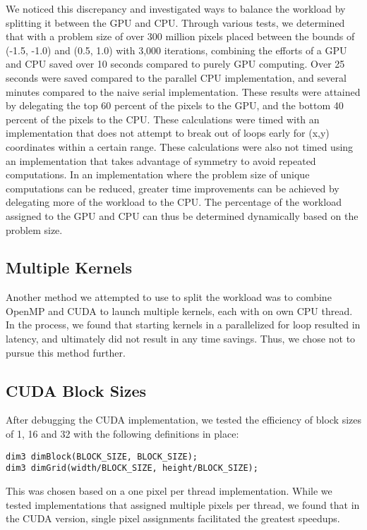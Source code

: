 \documentclass{article}
\begin{document}
We noticed this discrepancy and investigated ways to balance the workload by splitting it between the GPU and CPU.
Through various tests, we determined that with a problem size of over 300 million pixels placed between the bounds of (-1.5, -1.0) and (0.5, 1.0) with 3,000 iterations, combining the efforts of a GPU and CPU saved over 10 seconds compared to purely GPU computing.
Over 25 seconds were saved compared to the parallel CPU implementation, and several minutes compared to the naive serial implementation.
These results were attained by delegating the top 60 percent of the pixels to the GPU, and the bottom 40 percent of the pixels to the CPU.
These calculations were timed with an implementation that does not attempt to break out of loops early for (x,y) coordinates within a certain range.
These calculations were also not timed using an implementation that takes advantage of symmetry to avoid repeated computations.
In an implementation where the problem size of unique computations can be reduced, greater time improvements can be achieved by delegating more of the workload to the CPU.
The percentage of the workload assigned to the GPU and CPU can thus be determined dynamically based on the problem size.

\subsection{Multiple Kernels}

Another method we attempted to use to split the workload was to combine OpenMP and CUDA to launch multiple kernels, each with on own CPU thread.
In the process, we found that starting kernels in a parallelized for loop resulted in latency, and ultimately did not result in any time savings.
Thus, we chose not to pursue this method further.

\subsection{CUDA Block Sizes}

After debugging the CUDA implementation, we tested the efficiency of block sizes of 1, 16 and 32 with the following definitions in place: 

\begin{verbatim}
dim3 dimBlock(BLOCK_SIZE, BLOCK_SIZE); 
dim3 dimGrid(width/BLOCK_SIZE, height/BLOCK_SIZE);
\end{verbatim}

This was chosen based on a one pixel per thread implementation.
While we tested implementations that assigned multiple pixels per thread, we found that in the CUDA version, single pixel assignments facilitated the greatest speedups.
\end{document}
